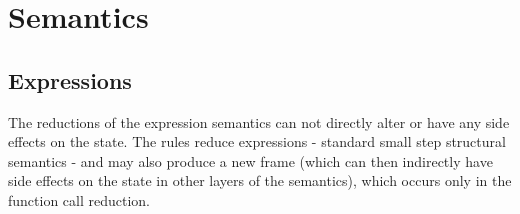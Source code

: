 \documentclass[UTF8]{article}
\begin{document}
%
%
%
%

\section{Semantics}

\subsection{Expressions}\label{sec:expsem}
The reductions of the expression semantics can not directly alter or have any side effects on the state. The rules reduce expressions - standard small step structural semantics - and may also produce a new frame (which can then indirectly have side effects on the state in other layers of the semantics), which occurs only in the function call reduction.  
\end{document}
